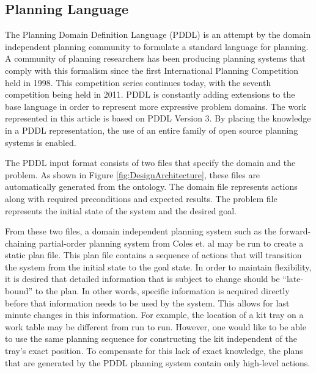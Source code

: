 \subsection{Planning Language}
The Planning Domain Definition Language (PDDL) \cite{PDDL} is an attempt by the
domain independent planning community to formulate a standard language
for planning. A community of planning researchers has been producing
planning systems that comply with this formalism since the first International
Planning Competition held in 1998. This competition series continues today,
with the seventh competition being held in 2011. PDDL is constantly
adding extensions to the base language in order to represent more expressive
problem domains. The work represented in this article is based on PDDL Version 3.
By placing the knowledge in a PDDL representation, the use of an
entire family of open source planning systems is enabled.

The PDDL input format consists
of two files that specify the domain and the problem. As shown in Figure
\ref{fig:DesignArchitecture}, these files are automatically
generated from the ontology. The domain file represents actions along
with required preconditions and expected results. The problem file
represents the initial state of the system and the desired goal.

From these two files, a domain independent planning system such as
the forward-chaining partial-order planning system from Coles et. al
\cite{Coles.ICAPS.2010} may be run to create a static plan file. This
plan file contains a sequence of actions that will transition the
system from the initial state to the goal state. 
In order to maintain flexibility, it is desired that detailed information
that is subject to change should be ``late-bound'' to the plan.
In other words, specific information is acquired directly before that
information needs to be used by the system.
This allows for last minute changes in this information. For example,
the location of a kit tray on a work table may be different from run to run.
However, one would like to be able to use the same planning sequence for 
constructing the kit independent of the tray's exact position.
To compensate for this lack of exact knowledge, the plans that are
generated by the PDDL planning system contain only high-level actions.

